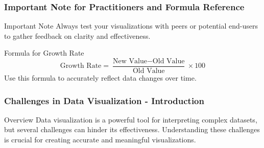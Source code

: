\documentclass[aspectratio=169]{beamer}
\begin{document}
\begin{frame}[fragile]
    \frametitle{Important Note for Practitioners and Formula Reference}
    \begin{block}{Important Note}
    Always test your visualizations with peers or potential end-users to gather feedback on clarity and effectiveness.
    \end{block}

    \begin{block}{Formula for Growth Rate}
        \begin{equation}
        \text{Growth Rate} = \frac{\text{New Value} - \text{Old Value}}{\text{Old Value}} \times 100
        \end{equation}
        Use this formula to accurately reflect data changes over time.
    \end{block}
\end{frame}

\begin{frame}[fragile]
    \frametitle{Challenges in Data Visualization - Introduction}
    \begin{block}{Overview}
        Data visualization is a powerful tool for interpreting complex datasets, but several challenges can hinder its effectiveness. Understanding these challenges is crucial for creating accurate and meaningful visualizations.
    \end{block}
\end{frame}
\end{document}
